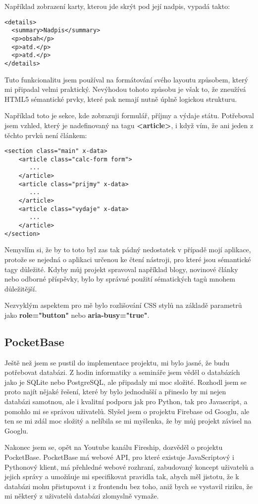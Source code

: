\documentclass[11pt,a4paper,twoside,openright]{report}
\begin{document}
Například zobrazení karty, kterou jde skrýt pod její nadpis, vypadá takto:

\begin{verbatim}
<details>
  <summary>Nadpis</summary>
  <p>obsah</p>
  <p>atd.</p>
  <p>atd.</p>
</details>
\end{verbatim}

Tuto funkcionalitu jsem používal na formátování svého layoutu způsobem, který mi připadal velmi praktický.
Nevýhodou tohoto způsobu je však to, že zneužívá HTML5 sémantické prvky, které pak nemají nutně úplně logickou
strukturu.

Například toto je sekce, kde zobrazuji formulář, příjmy a výdaje státu. Potřeboval jsem vzhled, který
je nadefinovaný na tagu \textbf{<article>}, i když vím, že ani jeden z těchto prvků není článkem:

\begin{verbatim}
<section class="main" x-data>
    <article class="calc-form form">
       ...
    </article>
    <article class="prijmy" x-data>
       ...
    </article>
    <article class="vydaje" x-data>
       ...
    </article>
</section>
\end{verbatim}

Nemyslím si, že by to toto byl zas tak pádný nedostatek v případě mojí aplikace, protože se nejedná o
aplikaci určenou ke čtení nástroji, pro které jsou sémantické tagy důležité. Kdyby můj projekt spravoval
například blogy, novinové články nebo odborné příspěvky, bylo by správné použití sématických tagů
mnohem důležitější.

Nezvyklým aspektem pro mě bylo rozlišování CSS stylů na základě parametrů jako \textbf{role="button"} nebo
\textbf{aria-busy="true"}.

\subsection{PocketBase}
Ještě než jsem se pustil do implementace projektu, mi bylo jasné, že budu potřebovat databázi. Z hodin
informatiky a semináře jsem věděl o databázích jako je SQLite nebo PostgreSQL, ale připadaly mi moc
složité. Rozhodl jsem se proto najít nějaké řešení, které by bylo jednodušší a přineslo by mi nejen databázi
samotnou, ale i kvalitní podporu jak pro Python, tak pro Javascript, a pomohlo mi se správou uživatelů.
Slyšel jsem o projektu Firebase od Googlu, ale ten se mi zdál moc složitý a nelíbila se mi myšlenka,
že by můj projekt závisel na Googlu.

Nakonec jsem se, opět na Youtube kanálu Fireship, dozvěděl o projektu PocketBase. PocketBase má webové API,
pro které existuje JavaScriptový i Pythonový klient, má přehledné webové rozhraní, zabudovaný koncept uživatelů
a jejich správy a umožňuje mi specifikovat pravidla tak, abych měl jistotu, že k databázi mohu přistupovat
i z frontendu bez toho, aniž bych se vystavil riziku, že mi některý z uživatelů databázi zlomyslně vymaže.
\end{document}
